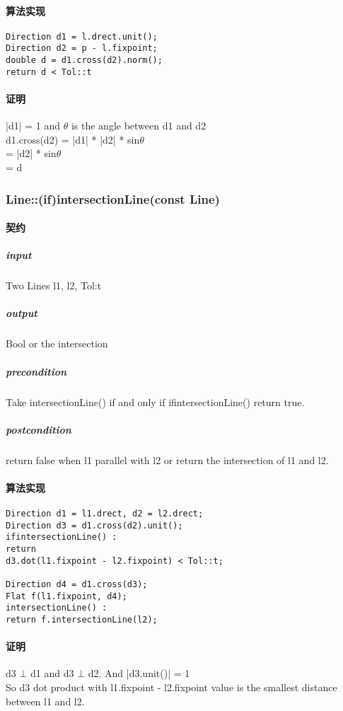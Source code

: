 \documentclass[a4paper]{book}
\numberwithin{equation}{chapter}
\theoremstyle{definition}
\begin{document}
\begin{multicols}{2}
\paragraph{算法实现}
\begin{lstlisting}
Direction d1 = l.drect.unit();
Direction d2 = p - l.fixpoint;
double d = d1.cross(d2).norm();
return d < Tol::t
\end{lstlisting}
\paragraph{证明}
|d1| = 1 and $ \theta $ is the angle between d1 and d2\\
d1.cross(d2) = |d1| * |d2| * sin$ \theta $ \\
= |d2| * sin$ \theta $ \\
= d
\subsubsection{Line::(if)intersectionLine(const Line)}
\paragraph{契约}
\subparagraph{input}
Two Lines l1, l2, Tol:t
\subparagraph{output}
Bool or the intersection
\subparagraph{precondition}
Take intersectionLine() if and only if ifintersectionLine() return true.
\subparagraph{postcondition}
return false when l1 parallel with l2 or return the intersection of l1 and l2.
\paragraph{算法实现}
\begin{lstlisting}
Direction d1 = l1.drect, d2 = l2.drect;
Direction d3 = d1.cross(d2).unit();
ifintersectionLine() : 
return 
d3.dot(l1.fixpoint - l2.fixpoint) < Tol::t;

Direction d4 = d1.cross(d3);
Flat f(l1.fixpoint, d4);
intersectionLine() : 
return f.intersectionLine(l2);

\end{lstlisting}
\paragraph{证明}
d3 $ \bot $ d1 and d3 $ \bot $ d2. And |d3.unit()| = 1\\

So d3 dot product with l1.fixpoint - l2.fixpoint value is the smallest distance between l1 and l2. \\


\end{multicols}
\end{document}
